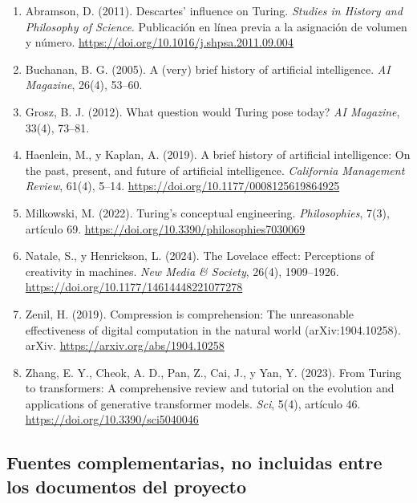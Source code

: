 \documentclass[12pt,letterpaper]{article}
\begin{document}
\begin{sloppypar}
\begin{enumerate}[leftmargin=1.2cm,itemsep=8pt]

\item Abramson, D. (2011). Descartes' influence on Turing. \textit{Studies in History and Philosophy of Science}. Publicaci\'on en l\'inea previa a la asignaci\'on de volumen y n\'umero. \url{https://doi.org/10.1016/j.shpsa.2011.09.004}

\item Buchanan, B. G. (2005). A (very) brief history of artificial intelligence. \textit{AI Magazine}, 26(4), 53--60.

\item Grosz, B. J. (2012). What question would Turing pose today? \textit{AI Magazine}, 33(4), 73--81.

\item Haenlein, M., y Kaplan, A. (2019). A brief history of artificial intelligence: On the past, present, and future of artificial intelligence. \textit{California Management Review}, 61(4), 5--14. \url{https://doi.org/10.1177/0008125619864925}

\item Milkowski, M. (2022). Turing's conceptual engineering. \textit{Philosophies}, 7(3), art\'iculo 69. \url{https://doi.org/10.3390/philosophies7030069}

\item Natale, S., y Henrickson, L. (2024). The Lovelace effect: Perceptions of creativity in machines. \textit{New Media \& Society}, 26(4), 1909--1926. \url{https://doi.org/10.1177/14614448221077278}

\item Zenil, H. (2019). Compression is comprehension: The unreasonable effectiveness of digital computation in the natural world (arXiv:1904.10258). arXiv. \url{https://arxiv.org/abs/1904.10258}

\item Zhang, E. Y., Cheok, A. D., Pan, Z., Cai, J., y Yan, Y. (2023). From Turing to transformers: A comprehensive review and tutorial on the evolution and applications of generative transformer models. \textit{Sci}, 5(4), art\'iculo 46. \url{https://doi.org/10.3390/sci5040046}

\end{enumerate}

\subsection*{Fuentes complementarias, no incluidas entre los documentos del proyecto}


\end{sloppypar}
\end{document}
